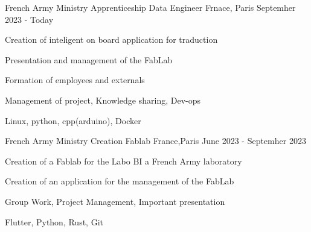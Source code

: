 

\begin{cventries}

  \cventry
    {French Army Ministry} %
    {Apprenticeship Data Engineer} %
    {Frnace, Paris} %
    {Septemher 2023 - Today} %
    {
      \begin{cvitems} %
        \item {Creation of inteligent on board application for traduction}
        \item {Presentation and management of the FabLab}
        \item {Formation of employees and externals}
      \end{cvitems}
    }
    {
      \begin{cvitemsskills} %
        \item {Management of project, Knowledge sharing, Dev-ops}
        \item {Linux, python, cpp(arduino), Docker }
      \end{cvitemsskills}
    }

  \cventry
    {French Army Ministry} %
    {Creation Fablab} %
    {France,Paris} %
    {June 2023 - Septemher 2023} %
    {
      \begin{cvitems} %
        \item {Creation of a Fablab for the Labo BI a French Army laboratory}
        \item {Creation of an application for the management of the FabLab}
      \end{cvitems}
    }
    {
      \begin{cvitemsskills} %
        \item {Group Work, Project Management, Important presentation}
        \item {Flutter, Python, Rust, Git }
      \end{cvitemsskills}
    }


\end{cventries}
